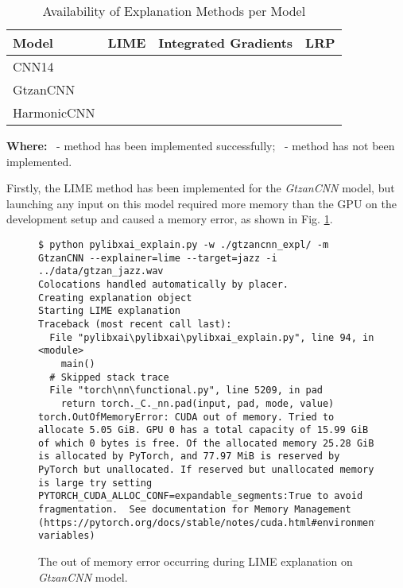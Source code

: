 \documentclass[
    bindingoffset=5mm,  %
    footnoteindent=3mm, %
    hyphenation=true    %
]{src/wut-thesis}
\newcommand{\cmark}{\ding{51}} %
\newcommand{\xmark}{\ding{55}} %
\begin{document}
\begin{table}[h]\centering
    \caption{Availability of Explanation Methods per Model}
    \begin{tabular}{lccc}
    \toprule
    \textbf{Model} & \textbf{LIME} & \textbf{Integrated Gradients} & \textbf{LRP} \\
    \midrule
    CNN14         & \cmark        & \cmark                         & \xmark       \\
    GtzanCNN      & \xmark        & \cmark                         & \cmark       \\
    HarmonicCNN   & \cmark        & \cmark                         & \xmark       \\
    \bottomrule
    \end{tabular}
\label{table:AvalibilityTable}

\hfill

\textbf{Where:} \cmark\ - method has been implemented successfully; \xmark\ - method has not been implemented.
\end{table}

Firstly, the LIME method has been implemented for the \emph{GtzanCNN} model, but launching any
input on this model required more memory than the GPU on the development setup and
caused a memory error, as shown in Fig. \ref{fig:LimeGtzanCNN}.

\begin{figure}%
\begin{verbatim}
$ python pylibxai_explain.py -w ./gtzancnn_expl/ -m GtzanCNN --explainer=lime --target=jazz -i ../data/gtzan_jazz.wav
Colocations handled automatically by placer.
Creating explanation object
Starting LIME explanation
Traceback (most recent call last):
  File "pylibxai\pylibxai\pylibxai_explain.py", line 94, in <module>
    main()
  # Skipped stack trace
  File "torch\nn\functional.py", line 5209, in pad
    return torch._C._nn.pad(input, pad, mode, value)
torch.OutOfMemoryError: CUDA out of memory. Tried to allocate 5.05 GiB. GPU 0 has a total capacity of 15.99 GiB of which 0 bytes is free. Of the allocated memory 25.28 GiB is allocated by PyTorch, and 77.97 MiB is reserved by PyTorch but unallocated. If reserved but unallocated memory is large try setting PYTORCH_CUDA_ALLOC_CONF=expandable_segments:True to avoid fragmentation.  See documentation for Memory Management  (https://pytorch.org/docs/stable/notes/cuda.html#environment-variables)
\end{verbatim}
\caption{The out of memory error occurring during LIME explanation on \emph{GtzanCNN} model.}
\label{fig:LimeGtzanCNN}
\end{figure}
\end{document}
